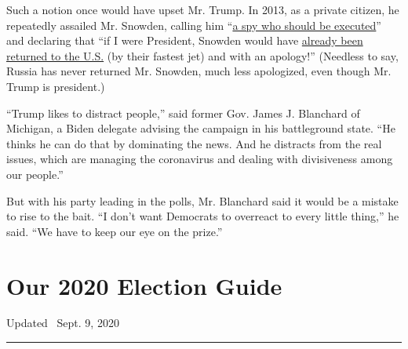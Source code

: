 Such a notion once would have upset Mr. Trump. In 2013, as a private
citizen, he repeatedly assailed Mr. Snowden, calling him
``\href{https://twitter.com/realDonaldTrump/status/395683702757662721}{a
spy who should be executed}'' and declaring that ``if I were President,
Snowden would have
\href{https://twitter.com/realDonaldTrump/status/346998236776640513}{already
been returned to the U.S.} (by their fastest jet) and with an apology!''
(Needless to say, Russia has never returned Mr. Snowden, much less
apologized, even though Mr. Trump is president.)

``Trump likes to distract people,'' said former Gov. James J. Blanchard
of Michigan, a Biden delegate advising the campaign in his battleground
state. ``He thinks he can do that by dominating the news. And he
distracts from the real issues, which are managing the coronavirus and
dealing with divisiveness among our people.''

But with his party leading in the polls, Mr. Blanchard said it would be
a mistake to rise to the bait. ``I don't want Democrats to overreact to
every little thing,'' he said. ``We have to keep our eye on the prize.''

\hypertarget{our-2020-election-guide}{%
\section{Our 2020 Election Guide}\label{our-2020-election-guide}}

Updated ~Sept. 9, 2020

\begin{center}\rule{0.5\linewidth}{\linethickness}\end{center}

